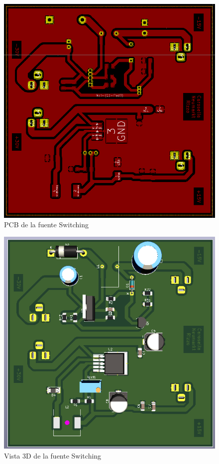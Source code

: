 \begin{figure}[H]
 \centering
    \includegraphics[scale=.38]{img/fuente/fuente_switching.PNG}
 \caption{PCB de la fuente Switching}
      \label{fig:fuente_PCB}
\end{figure}

\begin{figure}[H]
 \centering
    \includegraphics[scale=.52]{img/fuente/fuente_switching_3D.PNG}
    \caption{Vista 3D de la fuente Switching}
     \label{fig:fuente_3D}
     \end{figure}

